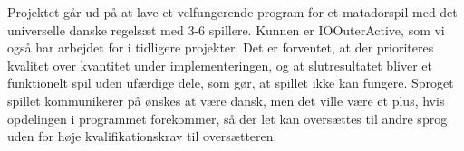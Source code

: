 \documentclass[class=article, crop=false]{standalone}
\begin{document}
    Projektet går ud på at lave et velfungerende program for et matadorspil med det universelle danske regelsæt med 3-6 spillere. Kunnen er IOOuterActive, som vi også har arbejdet for i tidligere projekter. Det er forventet, at der prioriteres kvalitet over kvantitet under implementeringen, og at slutresultatet bliver et funktionelt spil uden ufærdige dele, som gør, at spillet ikke kan fungere. Sproget spillet kommunikerer på ønskes at være dansk, men det ville være et plus, hvis opdelingen i programmet forekommer, så der let kan oversættes til andre sprog uden for høje kvalifikationskrav til oversætteren.
\end{document}
